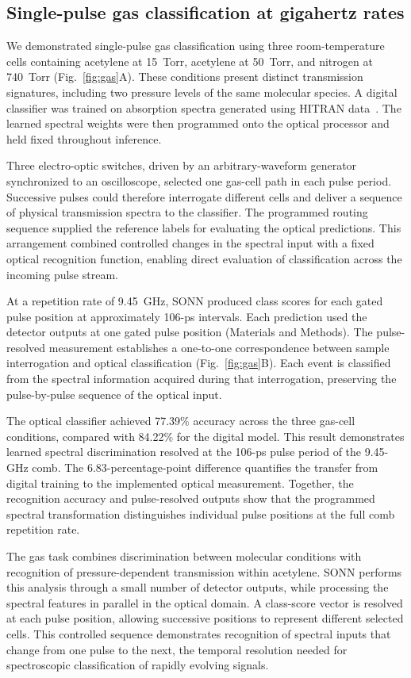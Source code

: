 \documentclass[11pt]{article}
\begin{document}
\subsection{Single-pulse gas classification at gigahertz rates}
We demonstrated single-pulse gas classification using three room-temperature cells containing acetylene at 15~Torr, acetylene at 50~Torr, and nitrogen at 740~Torr (Fig.~\ref{fig:gas}A). These conditions present distinct transmission signatures, including two pressure levels of the same molecular species. A digital classifier was trained on absorption spectra generated using HITRAN data~\cite{gordon2022}. The learned spectral weights were then programmed onto the optical processor and held fixed throughout inference.

Three electro-optic switches, driven by an arbitrary-waveform generator synchronized to an oscilloscope, selected one gas-cell path in each pulse period. Successive pulses could therefore interrogate different cells and deliver a sequence of physical transmission spectra to the classifier. The programmed routing sequence supplied the reference labels for evaluating the optical predictions. This arrangement combined controlled changes in the spectral input with a fixed optical recognition function, enabling direct evaluation of classification across the incoming pulse stream.

At a repetition rate of 9.45~GHz, SONN produced class scores for each gated pulse position at approximately 106-ps intervals. Each prediction used the detector outputs at one gated pulse position (Materials and Methods). The pulse-resolved measurement establishes a one-to-one correspondence between sample interrogation and optical classification (Fig.~\ref{fig:gas}B). Each event is classified from the spectral information acquired during that interrogation, preserving the pulse-by-pulse sequence of the optical input.

The optical classifier achieved 77.39\% accuracy across the three gas-cell conditions, compared with 84.22\% for the digital model. This result demonstrates learned spectral discrimination resolved at the 106-ps pulse period of the 9.45-GHz comb. The 6.83-percentage-point difference quantifies the transfer from digital training to the implemented optical measurement. Together, the recognition accuracy and pulse-resolved outputs show that the programmed spectral transformation distinguishes individual pulse positions at the full comb repetition rate.

The gas task combines discrimination between molecular conditions with recognition of pressure-dependent transmission within acetylene. SONN performs this analysis through a small number of detector outputs, while processing the spectral features in parallel in the optical domain. A class-score vector is resolved at each pulse position, allowing successive positions to represent different selected cells. This controlled sequence demonstrates recognition of spectral inputs that change from one pulse to the next, the temporal resolution needed for spectroscopic classification of rapidly evolving signals.
\end{document}
